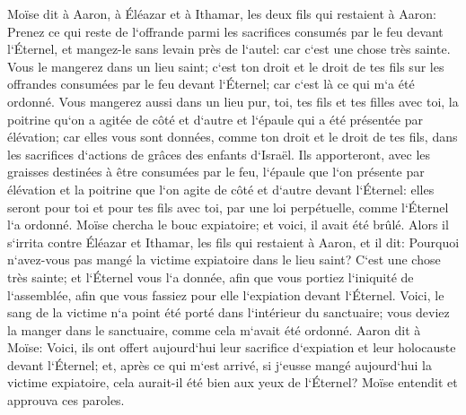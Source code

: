 \verse Moïse dit à Aaron, à Éléazar et à Ithamar, les deux fils qui restaient à Aaron: Prenez ce qui reste de l`offrande parmi les sacrifices consumés par le feu devant l`Éternel, et mangez-le sans levain près de l`autel: car c`est une chose très sainte. 
\verse Vous le mangerez dans un lieu saint; c`est ton droit et le droit de tes fils sur les offrandes consumées par le feu devant l`Éternel; car c`est là ce qui m`a été ordonné. 
\verse Vous mangerez aussi dans un lieu pur, toi, tes fils et tes filles avec toi, la poitrine qu`on a agitée de côté et d`autre et l`épaule qui a été présentée par élévation; car elles vous sont données, comme ton droit et le droit de tes fils, dans les sacrifices d`actions de grâces des enfants d`Israël. 
\verse Ils apporteront, avec les graisses destinées à être consumées par le feu, l`épaule que l`on présente par élévation et la poitrine que l`on agite de côté et d`autre devant l`Éternel: elles seront pour toi et pour tes fils avec toi, par une loi perpétuelle, comme l`Éternel l`a ordonné. 
\verse Moïse chercha le bouc expiatoire; et voici, il avait été brûlé. Alors il s`irrita contre Éléazar et Ithamar, les fils qui restaient à Aaron, et il dit: 
\verse Pourquoi n`avez-vous pas mangé la victime expiatoire dans le lieu saint? C`est une chose très sainte; et l`Éternel vous l`a donnée, afin que vous portiez l`iniquité de l`assemblée, afin que vous fassiez pour elle l`expiation devant l`Éternel. 
\verse Voici, le sang de la victime n`a point été porté dans l`intérieur du sanctuaire; vous deviez la manger dans le sanctuaire, comme cela m`avait été ordonné. 
\verse Aaron dit à Moïse: Voici, ils ont offert aujourd`hui leur sacrifice d`expiation et leur holocauste devant l`Éternel; et, après ce qui m`est arrivé, si j`eusse mangé aujourd`hui la victime expiatoire, cela aurait-il été bien aux yeux de l`Éternel? 
\verse Moïse entendit et approuva ces paroles. 

